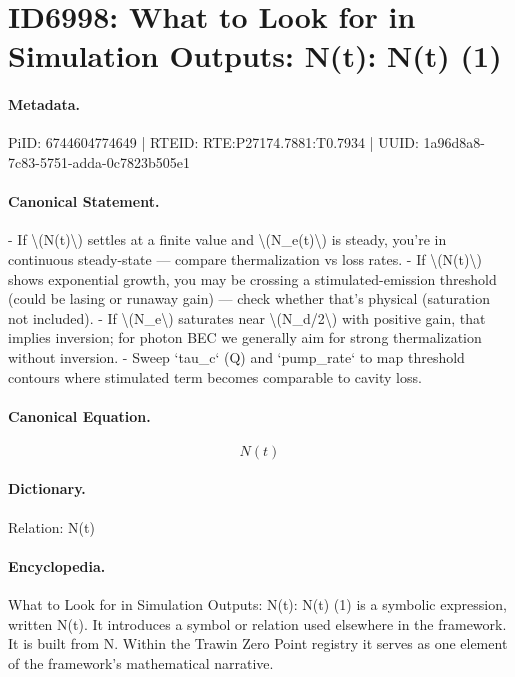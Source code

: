 \section*{ID6998: What to Look for in Simulation Outputs: N(t): N(t) (1)}
\paragraph{Metadata.}
PiID: 6744604774649 | RTEID: RTE:P27174.7881:T0.7934 | UUID: 1a96d8a8-7c83-5751-adda-0c7823b505e1

\paragraph{Canonical Statement.}
- If \textbackslash{}(N(t)\textbackslash{}) settles at a finite value and \textbackslash{}(N\_e(t)\textbackslash{}) is steady, you’re in continuous steady-state — compare thermalization vs loss rates. - If \textbackslash{}(N(t)\textbackslash{}) shows exponential growth, you may be crossing a stimulated-emission threshold (could be lasing or runaway gain) — check whether that’s physical (saturation not included). - If \textbackslash{}(N\_e\textbackslash{}) saturates near \textbackslash{}(N\_d/2\textbackslash{}) with positive gain, that implies inversion; for photon BEC we generally aim for strong thermalization without inversion. - Sweep `tau\_c` (Q) and `pump\_rate` to map threshold contours where stimulated term becomes comparable to cavity loss.

\paragraph{Canonical Equation.}
\[
N(t)
\]

\paragraph{Dictionary.}
Relation: N(t)

\paragraph{Encyclopedia.}
What to Look for in Simulation Outputs: N(t): N(t) (1) is a symbolic expression, written N(t). It introduces a symbol or relation used elsewhere in the framework. It is built from N. Within the Trawin Zero Point registry it serves as one element of the framework's mathematical narrative.
